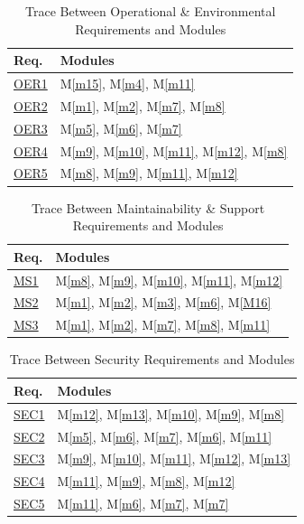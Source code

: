 \documentclass[12pt, titlepage]{article}
\newcommand{\mref}[1]{M\ref{#1}}
\begin{document}
\begin{table}[H]
\centering
\begin{tabular}{p{} p{}}
\toprule
\textbf{Req.} & \textbf{Modules}\\
\midrule
\hyperref[req:OE1]{OER1} & \mref{m15}, \mref{m4}, \mref{m11}\\
\hyperref[req:OE2]{OER2} & \mref{m1}, \mref{m2}, \mref{m7}, \mref{m8}\\
\hyperref[req:OE3]{OER3} & \mref{m5}, \mref{m6}, \mref{m7}\\
\hyperref[req:OE4]{OER4} & \mref{m9}, \mref{m10}, \mref{m11}, \mref{m12}, \mref{m8}\\
\hyperref[req:OE5]{OER5} & \mref{m8}, \mref{m9}, \mref{m11}, \mref{m12}\\
\bottomrule
\end{tabular}
\caption{Trace Between Operational \& Environmental Requirements and Modules}
\label{TblRTOperationalEnv}
\end{table}

\begin{table}[H]
\centering
\begin{tabular}{p{} p{}}
\toprule
\textbf{Req.} & \textbf{Modules}\\
\midrule
\hyperref[req:MS1]{MS1} & \mref{m8}, \mref{m9}, \mref{m10}, \mref{m11}, \mref{m12}\\
\hyperref[req:MS2]{MS2} & \mref{m1}, \mref{m2}, \mref{m3}, \mref{m6}, \mref{M16}\\
\hyperref[req:MS3]{MS3} & \mref{m1}, \mref{m2}, \mref{m7}, \mref{m8}, \mref{m11}\\
\bottomrule
\end{tabular}
\caption{Trace Between Maintainability \& Support Requirements and Modules}
\label{TblRTMaintainSupport}
\end{table}

\begin{table}[H]
\centering
\begin{tabular}{p{} p{}}
\toprule
\textbf{Req.} & \textbf{Modules}\\
\midrule
\hyperref[req:SEC1]{SEC1} & \mref{m12}, \mref{m13}, \mref{m10}, \mref{m9}, \mref{m8}\\
\hyperref[req:SEC2]{SEC2} & \mref{m5}, \mref{m6}, \mref{m7}, \mref{m6}, \mref{m11}\\
\hyperref[req:SEC3]{SEC3} & \mref{m9}, \mref{m10}, \mref{m11}, \mref{m12}, \mref{m13}\\
\hyperref[req:SEC4]{SEC4} & \mref{m11}, \mref{m9}, \mref{m8}, \mref{m12}\\
\hyperref[req:SEC5]{SEC5} & \mref{m11}, \mref{m6}, \mref{m7}, \mref{m7}\\
\bottomrule
\end{tabular}
\caption{Trace Between Security Requirements and Modules}
\label{TblRTSecurity}
\end{table}
\end{document}

